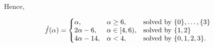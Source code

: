 Hence,

\begin{align*}
	\hat{f}(\alpha) = \left\{
		\begin{array}{lll}
		\!\!\!	\alpha, & \alpha \geq 6, & \text{solved by $\Set{0}, \dots, \Set{3}$}
			\\
		\!\!\!	2\alpha-6, & \alpha \in [4,6), & \text{solved by $\Set{1,2}$}
			\\
		\!\!\!	4\alpha-14, & \alpha <  4, & \text{solved by $\Set{0,1,2,3}$}
			.
		\end{array}
		\right.
\end{align*}






